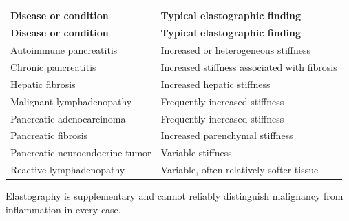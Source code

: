\begin{longtable}{@{}p{}p{}@{}}
\toprule
\textbf{Disease or condition} & \textbf{Typical elastographic finding} \\
\midrule
\endfirsthead
\toprule
\textbf{Disease or condition} & \textbf{Typical elastographic finding} \\
\midrule
\endhead
Autoimmune pancreatitis & Increased or heterogeneous stiffness \\
Chronic pancreatitis & Increased stiffness associated with fibrosis \\
Hepatic fibrosis & Increased hepatic stiffness \\
Malignant lymphadenopathy & Frequently increased stiffness \\
Pancreatic adenocarcinoma & Frequently increased stiffness \\
Pancreatic fibrosis & Increased parenchymal stiffness \\
Pancreatic neuroendocrine tumor & Variable stiffness \\
Reactive lymphadenopathy & Variable, often relatively softer tissue \\
\bottomrule
\end{longtable}
Elastography is supplementary and cannot reliably distinguish malignancy from inflammation in every case.

